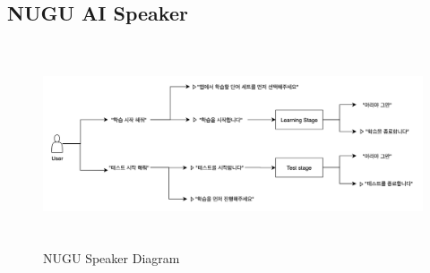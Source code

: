 \documentclass[conference]{IEEEtran}
\begin{document}
\subsection{NUGU AI Speaker}
\begin{figure}[h]
    \centering
    \hfill
    \includegraphics[width=\textwidth,height=6cm]{images/diagram_speaker.png}
    \hfill
    \caption{NUGU Speaker Diagram}
\end{figure}
\end{document}
